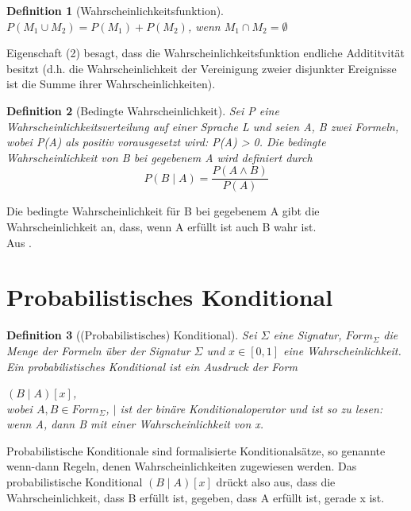 \documentclass[draft]{scrreprt}
\newtheorem{Def}{Definition }[section]
\begin{document}
{\begin{Def}[Wahrscheinlichkeitsfunktion]
$P(M_{1} \cup M_{2}) = P(M_{1}) + P(M_{2})$, wenn $M_{1} \cap M_{2} = \emptyset$
\end{Def}   
Eigenschaft (2) besagt, dass die Wahrscheinlichkeitsfunktion endliche Addititvität besitzt (d.h. die Wahrscheinlichkeit der Vereinigung zweier disjunkter Ereignisse ist die Summe ihrer Wahrscheinlichkeiten).\\

\begin{Def}[Bedingte Wahrscheinlichkeit] \label{sec: bed Wahr}
Sei P eine Wahrscheinlichkeitsverteilung auf einer Sprache L und seien A, B zwei Formeln, wobei P(A) als positiv vorausgesetzt wird: P(A) > 0. Die bedingte Wahrscheinlichkeit von B bei gegebenem A wird definiert durch\\
\[P( B\mid A ) = \frac{P(A\wedge B)}{P(A)}\]

\end{Def}
Die bedingte Wahrscheinlichkeit für B bei gegebenem A gibt die Wahrscheinlichkeit an, dass, wenn A erfüllt ist auch B wahr ist.\\
Aus \cite{BKI08}.
\newpage

\section{Probabilistisches Konditional}
\label{probKond}
\begin{Def}[(Probabilistisches) Konditional] 
Sei $ \Sigma $ eine Signatur, $ Form_{\Sigma} $ die Menge der Formeln über der Signatur $ \Sigma $ und $ x \in [0, 1] $ eine Wahrscheinlichkeit.
Ein probabilistisches Konditional ist ein Ausdruck der Form

\hspace{3 cm} $ (B \mid A)[x] $, \\
wobei $ A, B \in Form_\Sigma $, $ \mid $ ist der binäre Konditionaloperator und ist so zu lesen: wenn A, dann B mit einer Wahrscheinlichkeit von x. 
\end{Def}
Probabilistische Konditionale sind formalisierte Konditionalsätze, so genannte wenn-dann Regeln, denen Wahrscheinlichkeiten zugewiesen werden.
Das probabilistische Konditional $ (B \mid A)[x] $ drückt also aus, dass die Wahrscheinlichkeit, dass B erfüllt ist, gegeben, dass A erfüllt ist, gerade x ist.




}
\end{document}

